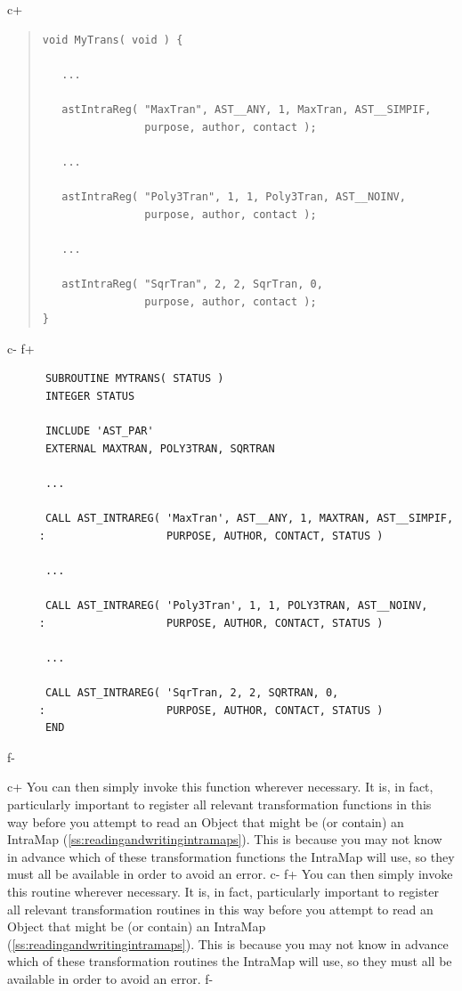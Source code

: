 \documentclass[twoside,11pt]{article}
\newcommand{\secref}[1]{\S\ref{#1}}
\renewcommand{\secref}[1]{\ref{#1}}
\begin{document}
c+
\begin{quote}
\small
\begin{verbatim}
void MyTrans( void ) {

   ...

   astIntraReg( "MaxTran", AST__ANY, 1, MaxTran, AST__SIMPIF,
                purpose, author, contact );

   ...

   astIntraReg( "Poly3Tran", 1, 1, Poly3Tran, AST__NOINV,
                purpose, author, contact );

   ...

   astIntraReg( "SqrTran", 2, 2, SqrTran, 0,
                purpose, author, contact );
}
\end{verbatim}
\normalsize
\end{quote}
c-
f+
\small
\begin{verbatim}
      SUBROUTINE MYTRANS( STATUS )
      INTEGER STATUS

      INCLUDE 'AST_PAR'
      EXTERNAL MAXTRAN, POLY3TRAN, SQRTRAN

      ...

      CALL AST_INTRAREG( 'MaxTran', AST__ANY, 1, MAXTRAN, AST__SIMPIF,
     :                   PURPOSE, AUTHOR, CONTACT, STATUS )

      ...

      CALL AST_INTRAREG( 'Poly3Tran', 1, 1, POLY3TRAN, AST__NOINV,
     :                   PURPOSE, AUTHOR, CONTACT, STATUS )

      ...

      CALL AST_INTRAREG( 'SqrTran, 2, 2, SQRTRAN, 0,
     :                   PURPOSE, AUTHOR, CONTACT, STATUS )
      END
\end{verbatim}
\normalsize
f-

c+
You can then simply invoke this function wherever necessary. It is, in
fact, particularly important to register all relevant transformation
functions in this way before you attempt to read an Object that might
be (or contain) an IntraMap
(\secref{ss:readingandwritingintramaps}). This is because you may not
know in advance which of these transformation functions the IntraMap
will use, so they must all be available in order to avoid an error.
c-
f+
You can then simply invoke this routine wherever necessary. It is, in
fact, particularly important to register all relevant transformation
routines in this way before you attempt to read an Object that might
be (or contain) an IntraMap
(\secref{ss:readingandwritingintramaps}). This is because you may not
know in advance which of these transformation routines the IntraMap
will use, so they must all be available in order to avoid an error.
f-
\end{document}
